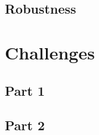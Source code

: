 \documentclass{article}
\begin{document}
        \subsection{Robustness}


    \section{Challenges}

        \subsection{Part 1}




 
        \subsection{Part 2}

\end{document}
